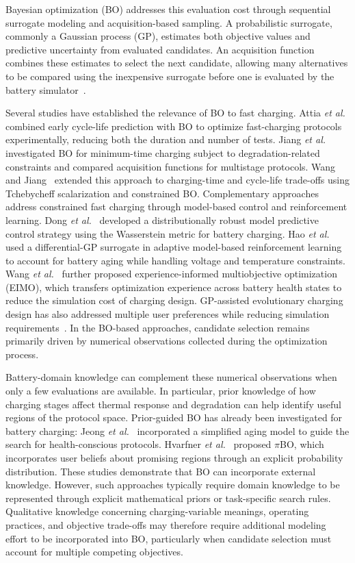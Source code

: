 \documentclass[journal,10pt]{IEEEtran}
\begin{document}
Bayesian optimization (BO) addresses this evaluation cost through sequential
surrogate modeling and acquisition-based sampling. A probabilistic surrogate,
commonly a Gaussian process (GP), estimates both objective values and predictive
uncertainty from evaluated candidates. An acquisition function combines these
estimates to select the next candidate, allowing many alternatives to be
compared using the inexpensive surrogate before one is evaluated by the battery
simulator~\cite{nref6}.

Several studies have established the relevance of BO to fast charging.
Attia \emph{et al.}~\cite{nref3} combined early cycle-life prediction with BO
to optimize fast-charging protocols experimentally, reducing both the duration
and number of tests. Jiang \emph{et al.}~\cite{nref7} investigated BO for
minimum-time charging subject to degradation-related constraints and compared
acquisition functions for multistage protocols. Wang and Jiang~\cite{nref8}
extended this approach to charging-time and cycle-life trade-offs using
Tchebycheff scalarization and constrained BO. Complementary approaches address
constrained fast charging through model-based control and reinforcement
learning. Dong \emph{et al.}~\cite{refDongBO} developed a distributionally robust
model predictive control strategy using the Wasserstein metric for battery
charging. Hao \emph{et al.}~\cite{refZhuMOBO} used a differential-GP surrogate
in adaptive model-based reinforcement learning to account for battery aging
while handling voltage and temperature constraints.
Wang \emph{et al.}~\cite{refEIMO} further proposed experience-informed
multiobjective optimization (EIMO), which transfers optimization experience
across battery health states to reduce the simulation cost of charging design.
GP-assisted evolutionary charging design has also addressed multiple user
preferences while reducing simulation requirements~\cite{refGPA}. In the
BO-based approaches, candidate selection remains primarily driven by numerical
observations collected during the optimization process.

Battery-domain knowledge can complement these numerical observations when only
a few evaluations are available. In particular, prior knowledge of how
charging stages affect thermal response and degradation can help identify
useful regions of the protocol space. Prior-guided BO has already been
investigated for battery charging: Jeong \emph{et al.}~\cite{refPriorCharging}
incorporated a simplified aging model to guide the search for health-conscious
protocols. Hvarfner \emph{et al.}~\cite{refPiBO} proposed $\pi$BO, which
incorporates user beliefs about promising regions through an explicit
probability distribution. These studies demonstrate that BO can incorporate
external knowledge. However, such approaches typically require domain
knowledge to be represented through explicit mathematical priors or
task-specific search rules. Qualitative knowledge concerning charging-variable
meanings, operating practices, and objective trade-offs may therefore require
additional modeling effort to be incorporated into BO, particularly when
candidate selection must account for multiple competing objectives.
\end{document}
